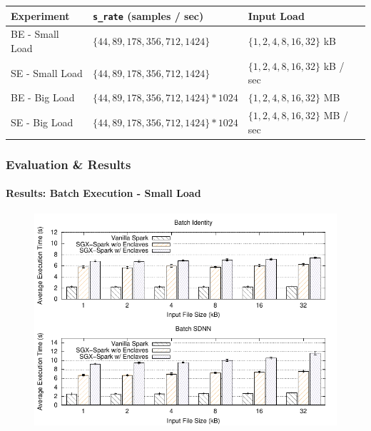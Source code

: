 \documentclass[10pt,    %
    english,            %
    xcolor=table,       %
    envcountsect,        %
    aspectratio=169     %
]{beamer}
\begin{document}
\begin{frame}
    \begin{table}[t]
        \centering
        \begin{tabular}{L{2.8cm}C{5.5cm}C{4.2cm}}
            \hline
            \textbf{Experiment} & \footnotesize{\textbf{\texttt{s\_rate} (samples / sec)}} & \textbf{Input Load} \\[3pt]
            \hline
            BE - Small Load & $\lbrace 44, 89, 178, 356, 712, 1424 \rbrace $ & $\lbrace 1, 2, 4, 8, 16, 32 \rbrace$ kB \\[3pt]
            SE - Small Load & $\lbrace 44, 89, 178, 356, 712, 1424 \rbrace$ & $\lbrace 1, 2, 4, 8, 16, 32 \rbrace$ kB / sec\\[3pt]
            BE - Big Load & $\lbrace 44, 89, 178, 356, 712, 1424 \rbrace * 1024$ & $\lbrace 1, 2, 4, 8, 16, 32 \rbrace$ MB \\[3pt]
            SE - Big Load & $\lbrace 44, 89, 178, 356, 712, 1424 \rbrace * 1024$ & $\lbrace 1, 2, 4, 8, 16, 32 \rbrace$ MB / sec\\[3pt]
            \hline
        \end{tabular}
    \end{table}

\end{frame}

\begin{frame}
    \frametitle{Evaluation \& Results}
    \framesubtitle{Results: Batch Execution - Small Load}

    \vspace{-15pt}

    \begin{figure}[T]
        \centering
        \includegraphics[width=.7\textwidth]{plots/input_size.pdf}
    \end{figure}

\end{frame}
\end{document}

